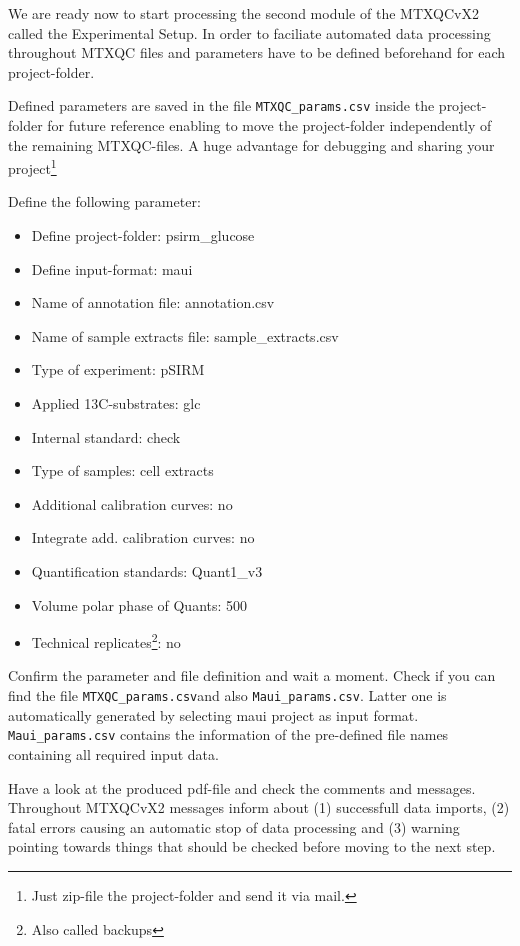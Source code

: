 \documentclass[]{book}
\providecommand{\tightlist}{%
  \setlength{\itemsep}{0pt}\setlength{\parskip}{0pt}}
\let\rmarkdownfootnote\footnote%
\def\footnote{\protect\rmarkdownfootnote}
\theoremstyle{definition}
\theoremstyle{definition}
\theoremstyle{definition}
\theoremstyle{remark}
\begin{document}
We are ready now to start processing the second module of the MTXQCvX2
called the Experimental Setup. In order to faciliate automated data
processing throughout MTXQC files and parameters have to be defined
beforehand for each project-folder.

Defined parameters are saved in the file \texttt{MTXQC\_params.csv}
inside the project-folder for future reference enabling to move the
project-folder independently of the remaining MTXQC-files. A huge
advantage for debugging and sharing your project\footnote{Just zip-file
  the project-folder and send it via mail.}

Define the following parameter:

\begin{itemize}
\tightlist
\item
  Define project-folder: psirm\_glucose
\item
  Define input-format: maui
\item
  Name of annotation file: annotation.csv
\item
  Name of sample extracts file: sample\_extracts.csv
\item
  Type of experiment: pSIRM
\item
  Applied 13C-substrates: glc
\item
  Internal standard: check
\item
  Type of samples: cell extracts
\item
  Additional calibration curves: no
\item
  Integrate add. calibration curves: no
\item
  Quantification standards: Quant1\_v3
\item
  Volume polar phase of Quants: 500
\item
  Technical replicates\footnote{Also called backups}: no
\end{itemize}

Confirm the parameter and file definition and wait a moment. Check if
you can find the file \texttt{MTXQC\_params.csv}and also
\texttt{Maui\_params.csv}. Latter one is automatically generated by
selecting maui project as input format. \texttt{Maui\_params.csv}
contains the information of the pre-defined file names containing all
required input data.

Have a look at the produced pdf-file and check the comments and
messages. Throughout MTXQCvX2 messages inform about (1) successfull data
imports, (2) fatal errors causing an automatic stop of data processing
and (3) warning pointing towards things that should be checked before
moving to the next step.
\end{document}
